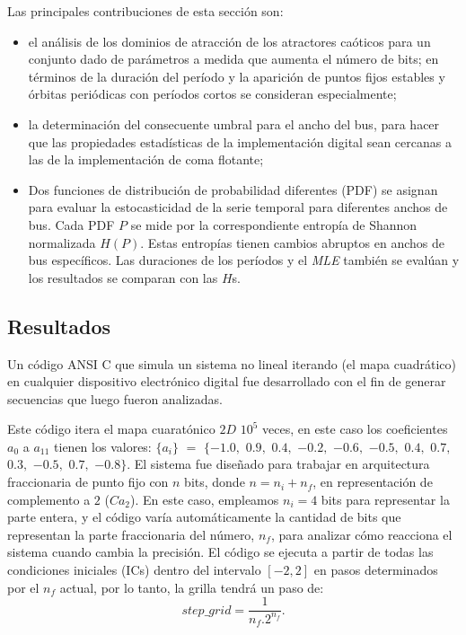 Las principales contribuciones de esta sección son:
\begin{itemize}
	\item el análisis de los dominios de atracción de los atractores caóticos para un conjunto dado de parámetros a medida que aumenta el número de bits; en términos de la duración del período y la aparición de puntos fijos estables y órbitas periódicas con períodos cortos se consideran especialmente;
	\item la determinación del consecuente umbral para el ancho del bus, para hacer que las propiedades estadísticas de la implementación digital sean cercanas a las de la implementación de coma flotante;
	\item Dos funciones de distribución de probabilidad diferentes (PDF) se asignan para evaluar la estocasticidad de la serie temporal para diferentes anchos de bus.
	Cada PDF $P$ se mide por la correspondiente entropía de Shannon normalizada $H(P)$.
	Estas entropías tienen cambios abruptos en anchos de bus específicos.
	Las duraciones de los períodos y el \textsl{MLE} también se evalúan y los resultados se comparan con las $H$s.
\end{itemize}

\subsection{Resultados}

Un código ANSI C que simula un sistema no lineal iterando (el mapa cuadrático) en cualquier dispositivo electrónico digital fue desarrollado con el fin de generar secuencias que luego fueron analizadas.

Este código itera el mapa cuaratónico $2D$ $10 ^ 5$ veces, en este caso los coeficientes $a_0$ a $a_ {11}$ tienen los valores: $\{a_i \}$ $=$ $\{- 1.0,$ $0.9,$ $0.4,$ $-0.2,$ $-0.6,$ $-0.5,$ $0.4,$ $0.7,$ $0.3,$ $-0.5,$ $0.7,$ $-0.8 \}$.
El sistema fue diseñado para trabajar en arquitectura fraccionaria de punto fijo con $n$ bits, donde $n = n_i + n_f$, en representación de complemento a $2$ ($Ca_2$).
En este caso, empleamos $n_i = 4$ bits para representar la parte entera, y el código varía automáticamente la cantidad de bits que representan la parte fraccionaria del número, $n_f$, para analizar cómo reacciona el sistema cuando cambia la precisión.
El código se ejecuta a partir de todas las condiciones iniciales (ICs) dentro del intervalo $[-2,2]$ en pasos determinados por el $n_f$ actual, por lo tanto, la grilla tendrá un paso de:
%
\begin{equation}
step\_grid=\frac{1}{n_f.2^{n_f}}.
\end{equation}


